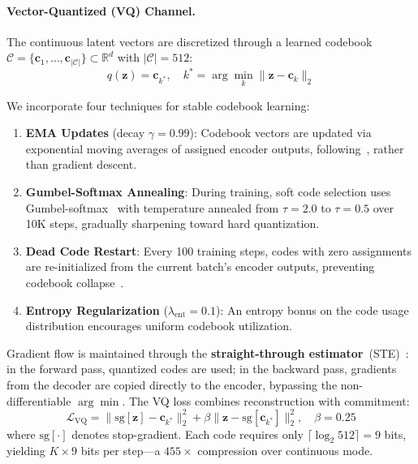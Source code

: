 \documentclass{article}
\newcommand{\RR}{\mathbb{R}}
\begin{document}
\paragraph{Vector-Quantized (VQ) Channel.}
The continuous latent vectors are discretized through a learned codebook $\mathcal{C} = \{\mathbf{c}_1, \ldots, \mathbf{c}_{|\mathcal{C}|}\} \subset \RR^d$ with $|\mathcal{C}|{=}512$:
\begin{equation}
q(\mathbf{z}) = \mathbf{c}_{k^*}, \quad k^* = \arg\min_k \|\mathbf{z} - \mathbf{c}_k\|_2
\label{eq:vq}
\end{equation}

\noindent We incorporate four techniques for stable codebook learning:

\begin{enumerate}[leftmargin=*,itemsep=1pt]
\item \textbf{EMA Updates} (decay $\gamma{=}0.99$): Codebook vectors are updated via exponential moving averages of assigned encoder outputs, following~\citet{oord2017vqvae}, rather than gradient descent.
\item \textbf{Gumbel-Softmax Annealing}: During training, soft code selection uses Gumbel-softmax~\cite{jang2017categorical} with temperature annealed from $\tau{=}2.0$ to $\tau{=}0.5$ over 10K steps, gradually sharpening toward hard quantization.
\item \textbf{Dead Code Restart}: Every 100 training steps, codes with zero assignments are re-initialized from the current batch's encoder outputs, preventing codebook collapse~\cite{dhariwal2020jukebox}.
\item \textbf{Entropy Regularization} ($\lambda_\text{ent}{=}0.1$): An entropy bonus on the code usage distribution encourages uniform codebook utilization.
\end{enumerate}

\noindent Gradient flow is maintained through the \textbf{straight-through estimator}~(STE)~\cite{bengio2013ste}: in the forward pass, quantized codes are used; in the backward pass, gradients from the decoder are copied directly to the encoder, bypassing the non-differentiable $\arg\min$.  The VQ loss combines reconstruction with commitment:
\begin{equation}
\mathcal{L}_\text{VQ} = \|\text{sg}[\mathbf{z}] - \mathbf{c}_{k^*}\|_2^2 + \beta \|\mathbf{z} - \text{sg}[\mathbf{c}_{k^*}]\|_2^2, \quad \beta = 0.25
\label{eq:vq_loss}
\end{equation}
where $\text{sg}[\cdot]$ denotes stop-gradient.  Each code requires only $\lceil \log_2 512 \rceil = 9$ bits, yielding $K \times 9$ bits per step---a $455\times$ compression over continuous mode.
\end{document}
